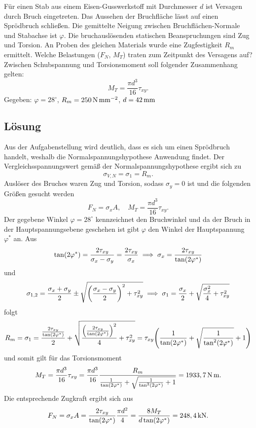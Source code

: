 \documentclass{exercise}
\begin{document}
    \begin{problem}
        Für einen Stab aus einem Eisen-Gusswerkstoff mit Durchmesser \(d\) ist Versagen durch Bruch eingetreten.
        Das Aussehen der Bruchfläche lässt auf einen Sprödbruch schließen.
        Die gemittelte Neigung zwischen Bruchflächen-Normale und Stabachse ist \(\varphi\).
        Die bruchauslösenden statischen Beanspruchungen sind Zug und Torsion.
        An Proben des gleichen Materials wurde eine Zugfestigkeit \(R_m\) ermittelt.
        Welche Belastungen (\(F_N\), \(M_T\)) traten zum Zeitpunkt des Versagens auf?
        Zwischen Schubspannung und Torsionsmoment soll folgender Zusammenhang gelten:
        \[
            M_T = \frac{\pi d^3}{16}\tau_{xy}.
        \]
        Gegeben: \(\varphi = 28^\circ\), \(R_m = 250\sis{\newton\per\milli\meter\squared}\), \(d = 42\sis{\milli\meter}\)
    \end{problem}

    \subsection*{Lösung}
    Aus der Aufgabenstellung wird deutlich, dass es sich um einen Sprödbruch handelt, weshalb die Normalspannungshypothese Anwendung findet.
    Der Vergleichsspannungswert gemäß der Normalspannungshypothese ergibt sich zu
    \[
        \sigma_{V, N} = \sigma_1 = R_m.
    \]
    Auslöser des Bruches waren Zug und Torsion, sodass \(\sigma_y = 0\) ist und die folgenden Größen gesucht werden
    \[
        F_N = \sigma_x A, \quad M_T = \frac{\pi d^3}{16}\tau_{xy}.
    \]
    Der gegebene Winkel \(\varphi = 28^\circ\) kennzeichnet den Bruchwinkel und da der Bruch in der Hauptspannungsebene geschehen ist gibt \(\varphi\) den Winkel der Hauptspannung \(\varphi^*\) an.
    Aus
    \[
        \tan\parentheses*{2\varphi^*} = \frac{2\tau_{xy}}{\sigma_x - \sigma_y} = \frac{2\tau_{xy}}{\sigma_x} \implies \sigma_x = \frac{2\tau_{xy}}{\tan\parentheses*{2\varphi^*}}
    \]
    und
    \[
        \sigma_{1, 2} = \frac{\sigma_x + \sigma_y}{2} \pm \sqrt{\parentheses*{\frac{\sigma_x - \sigma_y}{2}}^2 + \tau_{xy}^2} \implies \sigma_1 = \frac{\sigma_x}{2} + \sqrt{\frac{\sigma_x^2}{4} + \tau_{xy}^2}
    \]
    folgt
    \[
        R_m = \sigma_1 = \frac{\frac{2\tau_{xy}}{\tan\parentheses*{2\varphi^*}}}{2} + \sqrt{\frac{\parentheses*{\frac{2\tau_{xy}}{\tan\parentheses*{2\varphi^*}}}^2}{4} + \tau_{xy}^2} = \tau_{xy}\parentheses*{\frac{1}{\tan\parentheses*{2\varphi^*}} + \sqrt{\frac{1}{\tan^2\parentheses*{2\varphi^*}}} + 1}
    \]
    und somit gilt für das Torsionsmoment
    \[
        M_T = \frac{\pi d^3}{16}\tau_{xy} = \frac{\pi d^3}{16}\frac{R_m}{\frac{1}{\tan\parentheses*{2\varphi^*}} + \sqrt{\frac{1}{\tan^2\parentheses*{2\varphi^*}} + 1}} = 1933,7\sis{\newton\meter}.
    \]
    Die entsprechende Zugkraft ergibt sich aus
    \[
        F_N = \sigma_x A = \frac{2\tau_{xy}}{\tan\parentheses*{2\varphi^*}}\frac{\pi d^2}{4} = \frac{8M_T}{d\tan\parentheses*{2\varphi^*}} = 248,4\sis{\kilo\newton}.
    \]
\end{document}
